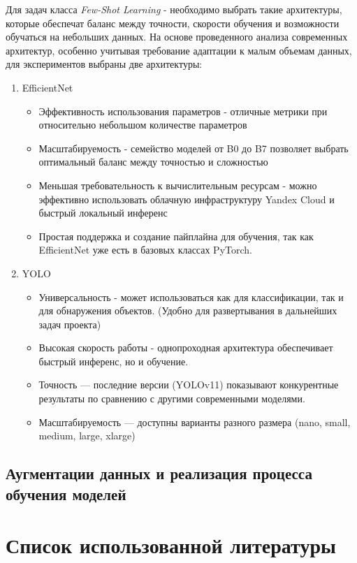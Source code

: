\documentclass[14pt]{extarticle}
\begin{document}
\hspace{1cm}
Для задач класса \textit{Few-Shot Learning} - необходимо выбрать такие архитектуры, которые обеспечат баланс между точности, скорости обучения и возможности обучаться на небольших данных. На основе проведенного анализа современных архитектур, особенно учитывая требование адаптации к малым объемам данных, для экспериментов выбраны две архитектуры:
\begin{enumerate}
\item EfficientNet

\begin{itemize}[leftmargin=-0.5cm]
    \item Эффективность использования параметров - отличные метрики при относительно небольшом количестве параметров
    \item Масштабируемость - семейство моделей от B0 до B7 позволяет выбрать оптимальный баланс между точностью и сложностью
    \item Меньшая требовательность к вычислительным ресурсам - можно эффективно использовать облачную инфраструктуру Yandex Cloud и быстрый локальный инференс
    \item Простая поддержка и создание пайплайна для обучения, так как EfficientNet уже есть в базовых классах PyTorch.
\end{itemize}
\item YOLO
\begin{itemize}[leftmargin=-0.5cm]
    \item Универсальность - может использоваться как для классификации, так и для обнаружения объектов. (Удобно для развертывания в дальнейших задач проекта)
    \item Высокая скорость работы - однопроходная архитектура обеспечивает быстрый инференс, но и обучение. 
    \item Точность --- последние версии (YOLOv11) показывают конкурентные результаты по сравнению с другими современными моделями.
    \item Масштабируемость --- доступны варианты разного размера (nano, small, medium, large, xlarge)
\end{itemize}
\end{enumerate}

\subsection{Аугментации данных и реализация процесса обучения моделей}
\section*{Список использованной литературы}
\printbibliography[heading=none]
\end{document}

